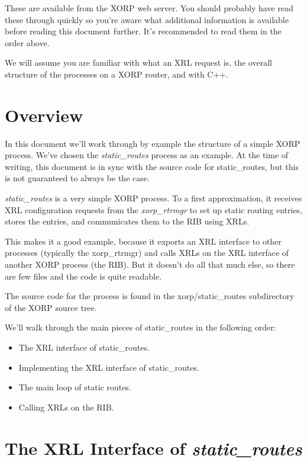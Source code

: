 \documentclass[11pt]{article}
\begin{document}
These are available from the XORP web server.  You should probably
have read these through quickly so you're aware what additional
information is available before reading this document further.  It's
recommended to read them in the order above.  

We will assume you are familiar with what an XRL request is, the
overall structure of the processes on a XORP router, and with C++.

\section{Overview}

In this document we'll work through by example the structure of a
simple XORP process.  We've chosen the {\it static\_routes} process as
an example.  At the time of writing, this document is in sync with the
source code for static\_routes, but this is not guaranteed to always be
the case.

{\it static\_routes} is a very simple XORP process.  To a first
approximation, it receives XRL configuration requests from the
{\it xorp\_rtrmgr} to set up static routing entries, stores the entries, and
communicates them to the RIB using XRLs.  

This makes it a good example, because it exports an XRL interface to
other processes (typically the xorp\_rtrmgr) and calls XRLs on the XRL
interface of another XORP process (the RIB).  But it doesn't do all
that much else, so there are few files and the code is quite readable.

The source code for the \SRI process is found in the {\stt
xorp/static\_routes} subdirectory of the XORP source tree.

We'll walk through the main pieces of static\_routes in the following
order:

\begin{itemize}
  \item The XRL interface of static\_routes.
  \item Implementing the XRL interface of static\_routes.
  \item The main loop of static routes.
  \item Calling XRLs on the RIB.
\end{itemize}


\newpage

\section{The XRL Interface of {\it static\_routes}}
\end{document}
